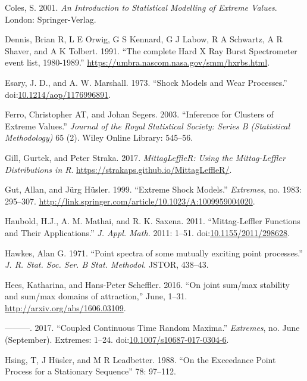 \documentclass[smallextended]{svjour3}       %
\begin{document}
\hypertarget{ref-ColesBook}{}
Coles, S. 2001. \emph{An Introduction to Statistical Modelling of
Extreme Values}. London: Springer-Verlag.

\hypertarget{ref-HXRBS}{}
Dennis, Brian R, L E Orwig, G S Kennard, G J Labow, R A Schwartz, A R
Shaver, and A K Tolbert. 1991. ``The complete Hard X Ray Burst
Spectrometer event list, 1980-1989.''
\url{https://umbra.nascom.nasa.gov/smm/hxrbs.html}.

\hypertarget{ref-Esary1973}{}
Esary, J. D., and A. W. Marshall. 1973. ``Shock Models and Wear
Processes.''
doi:\href{https://doi.org/10.1214/aop/1176996891}{10.1214/aop/1176996891}.

\hypertarget{ref-ferro2003inference}{}
Ferro, Christopher AT, and Johan Segers. 2003. ``Inference for Clusters
of Extreme Values.'' \emph{Journal of the Royal Statistical Society:
Series B (Statistical Methodology)} 65 (2). Wiley Online Library:
545--56.

\hypertarget{ref-MittagLeffleR}{}
Gill, Gurtek, and Peter Straka. 2017. \emph{MittagLeffleR: Using the
Mittag-Leffler Distributions in R}.
\url{https://strakaps.github.io/MittagLeffleR/}.

\hypertarget{ref-Gut1999}{}
Gut, Allan, and Jürg Hüsler. 1999. ``Extreme Shock Models.''
\emph{Extremes}, no. 1983: 295--307.
\url{http://link.springer.com/article/10.1023/A:1009959004020}.

\hypertarget{ref-Haubold11}{}
Haubold, H.J., A. M. Mathai, and R. K. Saxena. 2011. ``Mittag-Leffler
Functions and Their Applications.'' \emph{J. Appl. Math.} 2011: 1--51.
doi:\href{https://doi.org/10.1155/2011/298628}{10.1155/2011/298628}.

\hypertarget{ref-hawkes1971point}{}
Hawkes, Alan G. 1971. ``Point spectra of some mutually exciting point
processes.'' \emph{J. R. Stat. Soc. Ser. B Stat. Methodol.} JSTOR,
438--43.

\hypertarget{ref-Hees16}{}
Hees, Katharina, and Hans-Peter Scheffler. 2016. ``On joint sum/max
stability and sum/max domains of attraction,'' June, 1--31.
\url{http://arxiv.org/abs/1606.03109}.

\hypertarget{ref-Hees17}{}
---------. 2017. ``Coupled Continuous Time Random Maxima.''
\emph{Extremes}, no. June (September). Extremes: 1--24.
doi:\href{https://doi.org/10.1007/s10687-017-0304-6}{10.1007/s10687-017-0304-6}.

\hypertarget{ref-Hsing88}{}
Hsing, T, J Hüsler, and M R Leadbetter. 1988. ``On the Exceedance Point
Process for a Stationary Sequence'' 78: 97--112.
\end{document}
